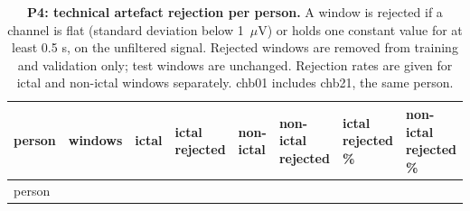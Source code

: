 \documentclass[11pt,a4paper]{article}
\begin{document}
\begin{longtable}[]{@{}
  >{\raggedright\arraybackslash}p{}
  >{\raggedright\arraybackslash}p{}
  >{\raggedright\arraybackslash}p{}
  >{\raggedright\arraybackslash}p{}
  >{\raggedright\arraybackslash}p{}
  >{\raggedright\arraybackslash}p{}
  >{\raggedright\arraybackslash}p{}
  >{\raggedright\arraybackslash}p{}@{}}
\caption{\textbf{P4: technical artefact rejection per person.} A window is rejected if a channel is flat (standard deviation below 1~\(\mu\)V) or holds one constant value for at least 0.5 s, on the unfiltered signal. Rejected windows are removed from training and validation only; test windows are unchanged. Rejection rates are given for ictal and non-ictal windows separately. chb01 includes chb21, the same person.}\tabularnewline
\toprule\noalign{}
\begin{minipage}[b]{\linewidth}\raggedright
person
\end{minipage} & \begin{minipage}[b]{\linewidth}\raggedright
windows
\end{minipage} & \begin{minipage}[b]{\linewidth}\raggedright
ictal
\end{minipage} & \begin{minipage}[b]{\linewidth}\raggedright
ictal rejected
\end{minipage} & \begin{minipage}[b]{\linewidth}\raggedright
non-ictal
\end{minipage} & \begin{minipage}[b]{\linewidth}\raggedright
non-ictal rejected
\end{minipage} & \begin{minipage}[b]{\linewidth}\raggedright
ictal rejected \%
\end{minipage} & \begin{minipage}[b]{\linewidth}\raggedright
non-ictal rejected \%
\end{minipage} \\
\midrule\noalign{}
\endfirsthead
\toprule\noalign{}
\begin{minipage}[b]{\linewidth}\raggedright
person
\end{minipage} & \begin{minipage}[b]{\linewidth}\raggedright

\end{minipage}
\end{longtable}
\end{document}
